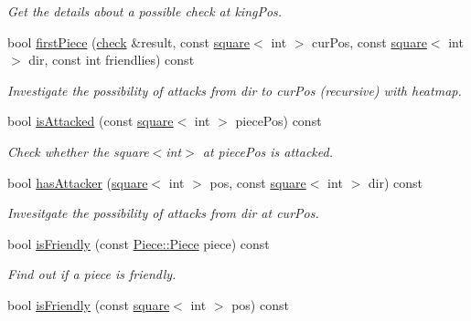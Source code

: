 \begin{DoxyCompactItemize}
\begin{DoxyCompactList}\small\item\em Get the details about a possible check at king\+Pos. \end{DoxyCompactList}\item 
bool \hyperlink{classBoard_a900420865c9acc6a18a9e25f94e3b72e}{first\+Piece} (\hyperlink{structcheck}{check} \&result, const \hyperlink{structsquare}{square}$<$ int $>$ cur\+Pos, const \hyperlink{structsquare}{square}$<$ int $>$ dir, const int friendlies) const
\begin{DoxyCompactList}\small\item\em Investigate the possibility of attacks from dir to cur\+Pos (recursive) with heatmap. \end{DoxyCompactList}\item 
\mbox{\label{classBoard_ae8183cabc093c8bd030250c42959fa37}} 
bool \hyperlink{classBoard_ae8183cabc093c8bd030250c42959fa37}{is\+Attacked} (const \hyperlink{structsquare}{square}$<$ int $>$ piece\+Pos) const
\begin{DoxyCompactList}\small\item\em Check whether the square$<$int$>$ at piece\+Pos is attacked. \end{DoxyCompactList}\item 
bool \hyperlink{classBoard_a8b9245cb469f2e82c23ac49edd412646}{has\+Attacker} (\hyperlink{structsquare}{square}$<$ int $>$ pos, const \hyperlink{structsquare}{square}$<$ int $>$ dir) const
\begin{DoxyCompactList}\small\item\em Invesitgate the possibility of attacks from dir at cur\+Pos. \end{DoxyCompactList}\item 
\mbox{\label{classBoard_a5068575e721428ee78754984813713e5}} 
bool \hyperlink{classBoard_a5068575e721428ee78754984813713e5}{is\+Friendly} (const \hyperlink{namespacePiece_a588233307aa6bdb32c1d62c9f20895cc}{Piece\+::\+Piece} piece) const
\begin{DoxyCompactList}\small\item\em Find out if a piece is friendly. \end{DoxyCompactList}\item 
\mbox{\label{classBoard_a33b5e15eeeba65612ad3005ff5e60690}} 
bool \hyperlink{classBoard_a33b5e15eeeba65612ad3005ff5e60690}{is\+Friendly} (const \hyperlink{structsquare}{square}$<$ int $>$ pos) const

\end{DoxyCompactItemize}
